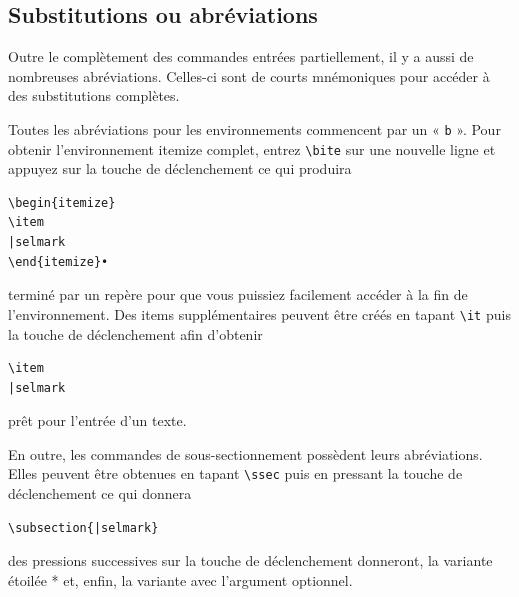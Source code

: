 \documentclass[11pt,french]{article}
\newcommand{\cmd}[1]{\textsf{#1}}
\begin{document}
\subsection{Substitutions ou abréviations}

Outre le complètement des commandes entrées partiellement, il y a aussi de nombreuses abréviations. Celles-ci sont de courts mnémoniques pour accéder à des substitutions complètes.

Toutes les abréviations pour les environnements commencent par un « \texttt{b} ». Pour obtenir l'environnement  \cmd{itemize} complet, entrez \verb|\bite| sur une nouvelle ligne et appuyez sur la touche de déclenchement ce qui produira

%
\begin{verbatim}
\begin{itemize}
\item
|selmark
\end{itemize}•
\end{verbatim}
terminé par un repère pour que vous puissiez facilement accéder à la fin de l'environnement. Des items supplémentaires peuvent être créés en tapant \verb|\it| puis la touche de déclenchement afin d'obtenir
\begin{verbatim}
\item
|selmark
\end{verbatim}
prêt pour l'entrée d'un texte.

En outre, les commandes de sous-sectionnement possèdent leurs abréviations. Elles peuvent être obtenues en tapant  \verb|\ssec| puis en pressant la touche de déclenchement ce qui donnera

\begin{verbatim}
\subsection{|selmark}
\end{verbatim}
des pressions successives sur la touche de déclenchement donneront, la variante étoilée * et, enfin, la variante avec l'argument optionnel.
\end{document}
